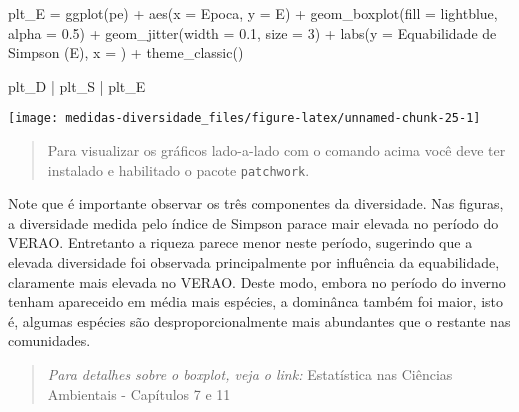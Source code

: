 \documentclass[
]{book}
\newenvironment{Shaded}{\begin{snugshade}}{\end{snugshade}}
\newcommand{\AttributeTok}[1]{\textcolor[rgb]{0.77,0.63,0.00}{#1}}
\newcommand{\DecValTok}[1]{\textcolor[rgb]{0.00,0.00,0.81}{#1}}
\newcommand{\FloatTok}[1]{\textcolor[rgb]{0.00,0.00,0.81}{#1}}
\newcommand{\FunctionTok}[1]{\textcolor[rgb]{0.00,0.00,0.00}{#1}}
\newcommand{\NormalTok}[1]{#1}
\newcommand{\OtherTok}[1]{\textcolor[rgb]{0.56,0.35,0.01}{#1}}
\newcommand{\SpecialCharTok}[1]{\textcolor[rgb]{0.00,0.00,0.00}{#1}}
\newcommand{\StringTok}[1]{\textcolor[rgb]{0.31,0.60,0.02}{#1}}
\begin{document}
\begin{Shaded}
\begin{Highlighting}[]
\NormalTok{plt\_E }\OtherTok{=} \FunctionTok{ggplot}\NormalTok{(pe) }\SpecialCharTok{+}
  \FunctionTok{aes}\NormalTok{(}\AttributeTok{x =}\NormalTok{ Epoca, }\AttributeTok{y =}\NormalTok{ E) }\SpecialCharTok{+}
  \FunctionTok{geom\_boxplot}\NormalTok{(}\AttributeTok{fill =} \StringTok{\textquotesingle{}lightblue\textquotesingle{}}\NormalTok{, }\AttributeTok{alpha =} \FloatTok{0.5}\NormalTok{) }\SpecialCharTok{+}
  \FunctionTok{geom\_jitter}\NormalTok{(}\AttributeTok{width =} \FloatTok{0.1}\NormalTok{, }\AttributeTok{size =} \DecValTok{3}\NormalTok{) }\SpecialCharTok{+}
  \FunctionTok{labs}\NormalTok{(}\AttributeTok{y =} \StringTok{\textquotesingle{}Equabilidade de Simpson (E)\textquotesingle{}}\NormalTok{, }
        \AttributeTok{x =} \StringTok{\textquotesingle{}\textquotesingle{}}\NormalTok{) }\SpecialCharTok{+}
  \FunctionTok{theme\_classic}\NormalTok{()}
\end{Highlighting}
\end{Shaded}

\begin{Shaded}
\begin{Highlighting}[]
\NormalTok{plt\_D }\SpecialCharTok{|}\NormalTok{ plt\_S }\SpecialCharTok{|}\NormalTok{ plt\_E}
\end{Highlighting}
\end{Shaded}

\begin{center}\texttt{[image: medidas-diversidade\_files/figure-latex/unnamed-chunk-25-1]} \end{center}

\begin{quote}
Para visualizar os gráficos lado-a-lado com o comando acima você deve ter instalado e habilitado o pacote \texttt{patchwork}.
\end{quote}

Note que é importante observar os três componentes da diversidade. Nas figuras, a diversidade medida pelo índice de Simpson parace mair elevada no período do VERAO. Entretanto a riqueza parece menor neste período, sugerindo que a elevada diversidade foi observada principalmente por influência da equabilidade, claramente mais elevada no VERAO. Deste modo, embora no período do inverno tenham apareceido em média mais espécies, a dominânca também foi maior, isto é, algumas espécies são desproporcionalmente mais abundantes que o restante nas comunidades.

\begin{quote}
\emph{Para detalhes sobre o boxplot, veja o link:} Estatística nas Ciências Ambientais - Capítulos 7 e 11
\end{quote}
\end{document}
